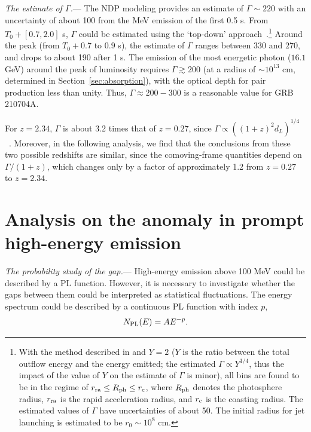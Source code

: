\documentclass[linenumbers,twocolumn]{aastex631}
\begin{document}
\textit{The estimate of $\Gamma$.}\label{sec:esti}---
The NDP modeling provides an estimate of $\Gamma\sim220$ with an uncertainty of about 100 from the MeV emission of the first 0.5 s. From $T_0+[0.7,2.0]$ s, $\Gamma$ could be estimated using the `top-down' approach~\citep{2015ApJ...801..103G,2024ApJ...961..137S}.\footnote{With the method described in \cite{2024ApJ...961..137S} and $Y=2$ ($Y$ is the ratio between the total outflow energy and the energy emitted; the estimated $\Gamma\propto Y^{1/4}$, thus the impact of the value of $Y$ on the estimate of $\Gamma$ is minor), all bins are found to be in the regime of $r_{\rm ra}\leq R_{\rm ph}\leq r_{\rm c}$, where $R_{\rm ph}$ denotes the photosphere radius, $r_{\rm ra}$ is the rapid acceleration radius, and $r_{\rm c}$ is the coasting radius. The estimated values of $\Gamma$ have uncertainties of about 50. The initial radius for jet launching is estimated to be $r_0\sim10^{8}$ cm.} Around the peak (from $T_0+0.7$ to $0.9$ s), the estimate of $\Gamma$ ranges between $330$ and $270$, and drops to about 190 after 1 s.
The emission of the most energetic photon ($16.1$ GeV) around the peak of luminosity requires $\Gamma \gtrsim 200$ (at a radius of $\sim10^{13}$ cm, determined in Section~\ref{sec:absorption}), with the optical depth for pair production less than unity. Thus, $\Gamma \approx 200-300$ is a reasonable value for GRB 210704A.%


For $z=2.34$, $\Gamma$ is about 3.2 times that of $z=0.27$, since $\Gamma\propto\left((1+z)^2d_L\right)^{1/4}$~\citep[e.g.,][]{2007ApJ...664L...1P}. Moreover, in the following analysis, we find that the conclusions from these two possible redshifts are similar, since the comoving-frame quantities depend on $\Gamma/(1+z)$, which changes only by a factor of approximately 1.2 from $z=0.27$ to $z=2.34$.



\section{Analysis on the anomaly in prompt high-energy emission}\label{sec:ana}
\textit{The probability study of the gap.}\label{sec: probstudy}--- High-energy emission above 100 MeV could be described by a PL function. However, it is necessary to investigate whether the gaps between them could be interpreted as statistical fluctuations. 
The energy spectrum could be described by a continuous PL function with index $p$, 
\begin{equation}\label{func:PL}
N_{\rm PL}(E)=A E^{-p}.
\end{equation}
\end{document}
